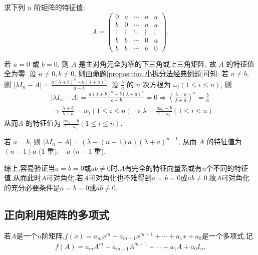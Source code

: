 \documentclass[../../main.tex]{subfiles}
\begin{document}
\begin{example}
求下列 $n$ 阶矩阵的特征值:
\[
A = \begin{pmatrix}
0 & a & \cdots & a & a \\
b & 0 & \cdots & a & a \\
\vdots & \vdots & \ddots & \vdots & \vdots \\
b & b & \cdots & 0 & a \\
b & b & \cdots & b & 0
\end{pmatrix}.
\]
\end{example}
\begin{solution}
若 $a = 0$ 或 $b = 0$, 则 $A$ 是主对角元全为零的下三角或上三角矩阵, 故 $A$ 的特征值全为零. 设 $a \neq 0, b \neq 0$, 则由\hyperref[proposition:小拆分法经典例题]{命题\ref{proposition:小拆分法经典例题}}可知:
若 $a \neq b$, 则 $|\lambda I_n-A|=\frac{a(\lambda +b)^n-b(\lambda +a)^n}{a-b}$. 设 $\frac{b}{a}$ 的 $n$ 次方根为 $\omega_i (1 \leq i \leq n)$, 则
\begin{align*}
&|\lambda I_n-A|=\frac{a(\lambda +b)^n-b(\lambda +a)^n}{a-b}=0\Rightarrow \left( \frac{\lambda +b}{\lambda +a} \right) ^n=\frac{b}{a}
\\
&\Rightarrow \frac{\lambda +b}{\lambda +a}=w_i\left( 1\le i\le n \right) \Rightarrow \lambda =\frac{a\omega _i-b}{1-\omega _i}(1\le i\le n).
\end{align*}
从而$A$ 的特征值为 $\frac{a \omega_i - b}{1 - \omega_i} (1 \leq i \leq n)$.

若 $a = b$, 则 $|\lambda I_n - A| = (\lambda - (n - 1)a)(\lambda + a)^{n-1}$, 从而 $A$ 的特征值为 $(n - 1)a$ (1 重), $-a$ ($n - 1$ 重).

综上,容易验证当$a=b=0$或$ab\ne0$时,$A$有完全的特征向量系或有$n$个不同的特征值,从而此时$A$可对角化.若$A$可对角化也不难得到$a=b=0$或$ab\ne0$.故$A$可对角化的充分必要条件是$a=b=0$或$ab\ne0$.
\end{solution}

\subsection{正向利用矩阵的多项式}

\begin{definition}[矩阵多项式]
若$A$是一个$n$阶矩阵,$f(x) = a_m x^m + a_{m-1} x^{m-1} + \cdots + a_1 x + a_0$是一个多项式,记
\begin{align*}
f(A) = a_m A^m + a_{m-1} A^{m-1} + \cdots + a_1 A + a_0 I_n.
\end{align*}
\end{definition}
\end{document}

